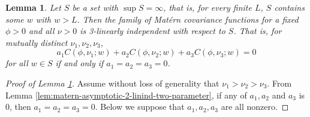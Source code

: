 \documentclass[11pt]{article}
\newtheorem{lemma}{Lemma}
\theoremstyle{definition}
\theoremstyle{remark}
\begin{document}
\begin{lemma}\label{lem:matern-asymptotic-3-linind}
Let $S$ be a set with $\sup S = \infty$, that is, for every finite $L$, $S$ contains some $w$ with $w>L$. Then the family of Mat\'ern covariance functions for a fixed $\phi>0$ and all $\nu>0$ is 3-linearly independent with respect to $S$. That is, for mutually distinct $\nu_1, \nu_2, \nu_3$, 
\begin{equation}\label{eq:matern-4}  a_1 C(\phi, \nu_1; w) + a_2 C(\phi, \nu_2; w) + a_3C(\phi, \nu_3;w) = 0\end{equation} for all $w\in S$ if and only if $a_1=a_2=a_3=0$.
\end{lemma}
\begin{proof}[Proof of Lemma \ref{lem:matern-asymptotic-3-linind}] 
Assume without loss of generality that $\nu_1 > \nu_2 > \nu_3$. From Lemma \ref{lem:matern-asymptotic-2-linind-two-parameter}, if any of $a_1, a_2$ and $a_3$ is $0$, then $a_1=a_2=a_3=0$. 
Below we suppose that 
$a_1, a_2, a_3$ are all nonzero.


\end{proof}
\end{document}
